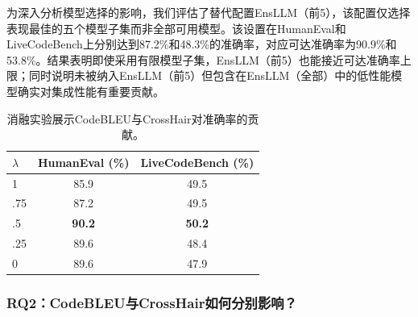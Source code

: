 \documentclass{article}
\newcommand{\tool}{EnsLLM}
\begin{document}
\begin{CJK*}{UTF8}{gbsn}
为深入分析模型选择的影响，我们评估了替代配置\tool（前5），该配置仅选择表现最佳的五个模型子集而非全部可用模型。该设置在HumanEval和LiveCodeBench上分别达到87.2\%和48.3\%的准确率，对应可达准确率为90.9\%和53.8\%。结果表明即使采用有限模型子集，EnsLLM（前5）也能接近可达准确率上限；同时说明未被纳入\tool（前5）但包含在\tool（全部）中的低性能模型确实对集成性能有重要贡献。
\begin{table}[t!]
    \centering
    \caption{消融实验展示CodeBLEU与CrossHair对准确率的贡献。}
    \label{tab:ablation_codebleu_crosshair}
    \begin{tabular}{|l|c|c|}
        \hline
        \textbf{$\lambda$} & \textbf{HumanEval (\%)} & \textbf{LiveCodeBench (\%)} \\
        \hline
        1 & 85.9 & 49.5 \\
        .75 & 87.2 & 49.5 \\
        .5 & \textbf{90.2} & \textbf{50.2} \\
        .25 & 89.6 & 48.4 \\
        0 & 89.6 & 47.9 \\
        \hline
    \end{tabular}
\end{table}
\begin{table}[t!]
    \centering
    \caption{不同CodeBLEU权重配置对准确率的影响。}
    \label{tab:codebleu_variants}
\end{table}
\subsubsection{RQ2：CodeBLEU与CrossHair如何分别影响？}


\end{CJK*}
\end{document}
